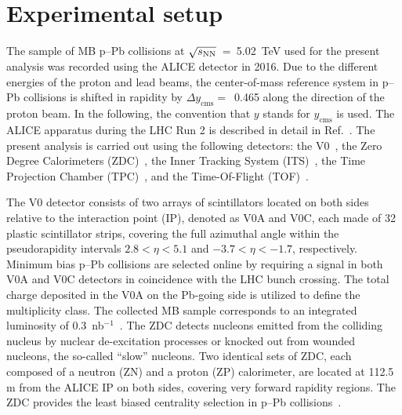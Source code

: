 \section{Experimental setup}
\label{sec:setup}
The sample of MB p--Pb collisions at $\sqrt{s_{\rm NN}}$~=~5.02~TeV used for the present analysis was recorded using the ALICE detector in 2016. Due to the different energies of the proton and lead beams, the center-of-mass reference system in p--Pb collisions is shifted in rapidity by $\Delta y_{\mathrm{cms}} =$~0.465 along the direction of the proton beam. In the following, the convention that $y$ stands for $y_{\mathrm{cms}}$ is used. The ALICE apparatus during the LHC Run 2 is described in detail in Ref.~\cite{Abelev:2014ffa}. The present analysis is carried out using the following detectors: the V0~\cite{ALICE:2013axi}, the Zero Degree Calorimeters (ZDC)~\cite{Cortese:2019nnv}, the Inner Tracking System (ITS)~\cite{ALICE:2010tia}, the Time Projection Chamber (TPC)~\cite{Alme:2010ke}, and the Time-Of-Flight (TOF)~\cite{Jacazio:2018slq}. 

The V0 detector consists of two arrays of scintillators located on both sides relative to the interaction point (IP), denoted as V0A and V0C, each made of 32 plastic scintillator strips, covering the full azimuthal angle within the pseudorapidity intervals $2.8 < \eta < 5.1$ and $-3.7 < \eta < -1.7$, respectively. Minimum bias p--Pb collisions are selected online by requiring a signal in both V0A and V0C detectors in coincidence with the LHC bunch crossing. The total charge deposited in the V0A on the Pb-going side is utilized to define the multiplicity class. The collected MB sample corresponds to an integrated luminosity of 0.3~nb$^{-1}$~\cite{ALICE:2014gvw}. The ZDC detects nucleons emitted from the colliding nucleus by nuclear de-excitation processes or knocked out from wounded nucleons, the so-called “slow” nucleons. Two identical sets of ZDC, each composed of a neutron (ZN) and a proton (ZP) calorimeter, are located at 112.5 m from the ALICE IP on both sides, covering very forward rapidity regions. The ZDC provides the least biased centrality selection in p--Pb collisions~\cite{ALICE:2014xsp}.

